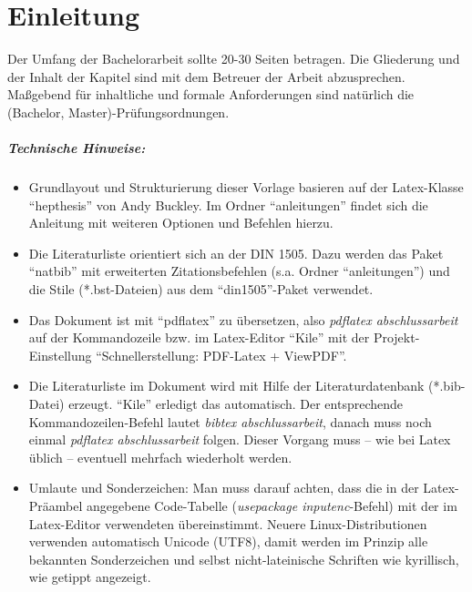 \chapter{Einleitung}
\label{kap-einleitung}



Der Umfang der Bachelorarbeit sollte 20-30 Seiten betragen.
Die Gliederung und der Inhalt der Kapitel sind mit dem Betreuer der Arbeit abzusprechen. Maßgebend für inhaltliche und formale Anforderungen sind natürlich die (Bachelor, Master)-\-Prüfungs\-ordnungen.

\paragraph{Technische Hinweise:}
\begin{itemize}
  \item Grundlayout und Strukturierung dieser Vorlage basieren auf der Latex-Klasse ``hepthesis'' von Andy Buckley. Im Ordner ``anleitungen'' findet sich die Anleitung mit weiteren Optionen und Befehlen hierzu.
  \item Die Literaturliste orientiert sich an der DIN 1505. Dazu werden das Paket ``natbib'' mit erweiterten Zitationsbefehlen (s.a. Ordner ``anleitungen'') und die Stile (*.bst-Dateien) aus dem ``din1505''-Paket verwendet. 
  \item Das Dokument ist mit ``pdflatex'' zu übersetzen, also \textit{pdflatex abschlussarbeit} auf der Kommandozeile bzw. im Latex-Editor ``Kile'' mit der Projekt-Einstellung ``Schnell\-erstellung: PDF-Latex + ViewPDF''.
  \item Die Literaturliste im Dokument wird mit Hilfe der Literaturdatenbank (*.bib-Datei) erzeugt. ``Kile'' erledigt das automatisch. Der entsprechende Kommando\-zeilen-Befehl lautet \textit{bibtex abschlussarbeit}, danach muss noch einmal \textit{pdflatex abschlussarbeit} folgen. Dieser Vorgang muss -- wie bei Latex üblich -- eventuell mehrfach wiederholt werden.
  \item Umlaute und Sonderzeichen: Man muss darauf achten, dass die in der Latex-Präambel angegebene Code-Tabelle (\textit{usepackage inputenc}-Befehl) mit der im Latex-Editor verwendeten übereinstimmt. Neuere Linux-Distributionen verwenden automatisch Unicode (UTF8), damit werden im Prinzip alle bekannten Sonderzeichen und selbst nicht-lateinische Schriften wie kyrillisch, wie getippt angezeigt.
\end{itemize}

